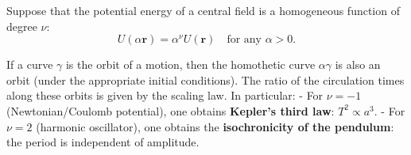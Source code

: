 Suppose that the potential energy of a central field is a homogeneous function of degree $\nu$:
$$U(\alpha \mathbf{r}) = \alpha^\nu U(\mathbf{r}) \quad \text{for any } \alpha > 0.$$

If a curve $\gamma$ is the orbit of a motion, then the homothetic curve $\alpha \gamma$ is also an orbit (under the appropriate initial conditions). The ratio of the circulation times along these orbits is given by the scaling law. In particular:
- For $\nu = -1$ (Newtonian/Coulomb potential), one obtains \textbf{Kepler's third law}: $T^2 \propto a^3$.
- For $\nu = 2$ (harmonic oscillator), one obtains the \textbf{isochronicity of the pendulum}: the period is independent of amplitude.
